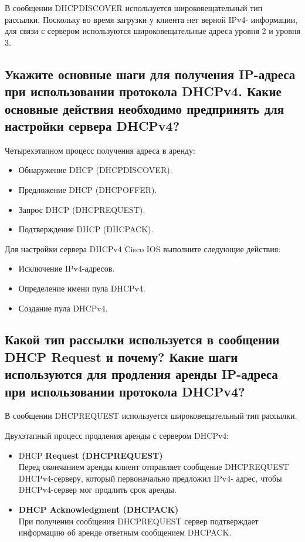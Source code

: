 В сообщении DHCPDISCOVER используется широковещательный тип 
рассылки. Поскольку во время загрузки у клиента нет верной IPv4-
информации, для связи с сервером используются широковещательные адреса 
уровня 2 и уровня 3.

\subsection{Укажите основные шаги для получения IP-адреса при 
использовании протокола DHCPv4. Какие основные действия 
необходимо предпринять для настройки сервера DHCPv4?}
Четырехэтапном процесс получения адреса в аренду:
\begin{itemize}
	\item Обнаружение DHCP (DHCPDISCOVER).
	\item Предложение DHCP (DHCPOFFER).
	\item Запрос DHCP (DHCPREQUEST).
	\item Подтверждение DHCP (DHCPACK).
\end{itemize}

Для настройки сервера DHCPv4 Cisco IOS выполните следующие 
действия:
\begin{itemize}
	\item Исключение IPv4-адресов.
	\item Определение имени пула DHCPv4.
	\item Создание пула DHCPv4.
\end{itemize}

\subsection{Какой тип рассылки используется в сообщении DHCP Request и 
почему? Какие шаги используются для продления аренды IP-адреса
при использовании протокола DHCPv4?}
В сообщении DHCPREQUEST используется широковещательный тип 
рассылки.

Двухэтапный процесс продления аренды с сервером DHCPv4:
\begin{itemize}
	\item DHCP \textbf{Request (DHCPREQUEST)}\\
		Перед окончанием аренды клиент отправляет сообщение 
		DHCPREQUEST DHCPv4-серверу, который первоначально предложил IPv4-
		адрес, чтобы DHCPv4-сервер мог продлить срок аренды.
	\item \textbf{DHCP Acknowledgment (DHCPACK)}\\
		При получении сообщения DHCPREQUEST сервер подтверждает 
		информацию об аренде ответным сообщением DHCPACK.
\end{itemize}

